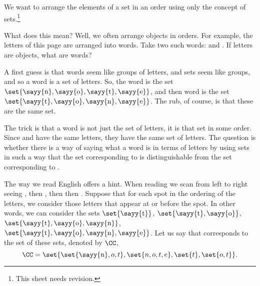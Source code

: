 

We want to arrange the elements of a set in an order using only the concept of sets.\footnote{This sheet needs revision.}


What does this mean?  Well, we often arrange objects in orders.
For example, the letters of this page are arranged into words.
Take two such words:  and .
If letters are objects, what are words?

A first guess is that words seem like groups of letters, and sets seem like groups, and so a word is a set of letters.
So, the word  is the set $\set{\text{\sayy{n}}, \text{\sayy{o}}, \text{\sayy{t}}, \text{\sayy{e}}}$, and then word  is the set
$\set{\text{\sayy{t}}, \text{\sayy{o}}, \text{\sayy{n}}, \text{\sayy{e}}}$.
The rub, of course, is that these are the same set.

The trick is that a word is not just the set of letters, it is that set in some order.
Since  and  have the same letters, they have the same set of letters.
The question is whether there is a way of saying what a word is in terms of letters by using sets in such a way that the set corresponding to  is distinguishable from the set corresponding to .

The way we read English offers a hint.
When reading  we scan from left to right seeing , then , then  then .
Suppose that for each spot in the ordering of the letters, we consider those letters that appear at or before the spot.
In other words, we can consider the sets $\set{\text{\sayy{t}}}$, $\set{\text{\sayy{t}}, \text{\sayy{o}}}$, $\set{\text{\sayy{t}}, \text{\sayy{o}}, \text{\sayy{n}}}$, $\set{\text{\sayy{t}}, \text{\sayy{o}}, \text{\sayy{n}}, \text{\sayy{e}}}$.
Let us say that  corresponds to the set of these sets, denoted by $\CC$,
\[
  \CC = \set{\set{\text{\sayy{n}}, o, t}, \set{n, o, t, e}, \set{t}, \set{o, t}}.
\]

